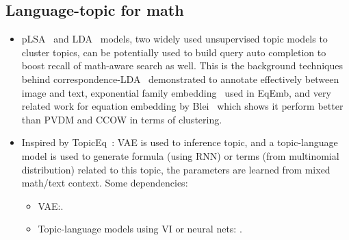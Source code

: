 \documentclass[11pt]{artikel3}
\begin{document}
\subsection{Language-topic for math}
\begin{itemize}
\item pLSA~\cite{hofmann1999probabilistic} and LDA~\cite{blei2003latent} models, two widely used unsupervised topic models to cluster topics, can be potentially used to build query auto completion to boost recall of math-aware search as well.
This is the background techniques behind correspondence-LDA~\cite{blei2003modeling} demonstrated to annotate effectively between image and text, exponential family embedding~\cite{rudolph2016exponential} used in EqEmb, and very related work for equation embedding by Blei~\cite{krstovski2018equation} which shows it perform better than PVDM and CCOW in terms of clustering.
\item Inspired by TopicEq~\cite{yasunaga2019topiceq}: VAE is used to inference topic, and a topic-language model is used to generate formula (using RNN) or terms (from multinomial distribution) related to this topic, the parameters are learned from mixed math/text context. Some dependencies:
	\begin{itemize}
	\item VAE:\cite{kingma2013auto}.
	\item Topic-language models using VI or neural nets: \cite{miao2016neural, ahn2016neural, dieng2016topicrnn, lau2017topically, miao2017discovering, srivastava2017autoencoding, wang2017topic}.
	\end{itemize}

\end{itemize}
\end{document}
